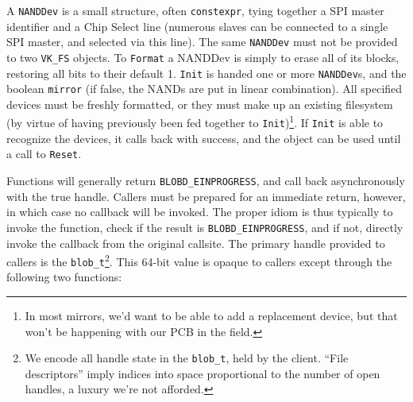 \documentclass[letterpaper,10pt]{article}
\begin{document}
A {\texttt{NANDDev}} is a small structure, often {\texttt{constexpr}}, tying
together a SPI master identifier and a Chip Select line (numerous slaves can be
connected to a single SPI master, and selected via this line). The same {\texttt{NANDDev}}
must not be provided to two {\texttt{VK\_FS}} objects. To {\texttt{Format}} a
NANDDev is simply to erase all of its blocks, restoring all bits to their default
1. {\texttt{Init}} is handed one or more {\texttt{NANDDev}}s, and the boolean
{\texttt{mirror}} (if false, the NANDs are put in linear combination). All
specified devices must be freshly formatted, or they must make up an existing
filesystem (by virtue of having previously been fed together to
{\texttt{Init}})\footnote{In most mirrors, we'd want to be able to add a
  replacement device, but that won't be happening with our PCB in the field.}.
If {\texttt{Init}} is able to recognize the devices, it calls back with
success, and the object can be used until a call to {\texttt{Reset}}.

Functions will generally return {\texttt{BLOBD\_EINPROGRESS}}, and call back
asynchronously with the true handle. Callers must be prepared for an immediate
return, however, in which case no callback will be invoked. The proper idiom
is thus typically to invoke the function, check if the result is
{\texttt{BLOBD\_EINPROGRESS}}, and if not, directly invoke the callback
from the original callsite. The primary handle provided to callers is the
{\texttt{blob\_t}}\footnote{We encode all handle state in the \texttt{blob\_t},
  held by the client. ``File descriptors'' imply indices into space
  proportional to the number of open handles, a luxury we're not afforded.}.
This 64-bit value is opaque to callers except through the following two
functions:
\end{document}
